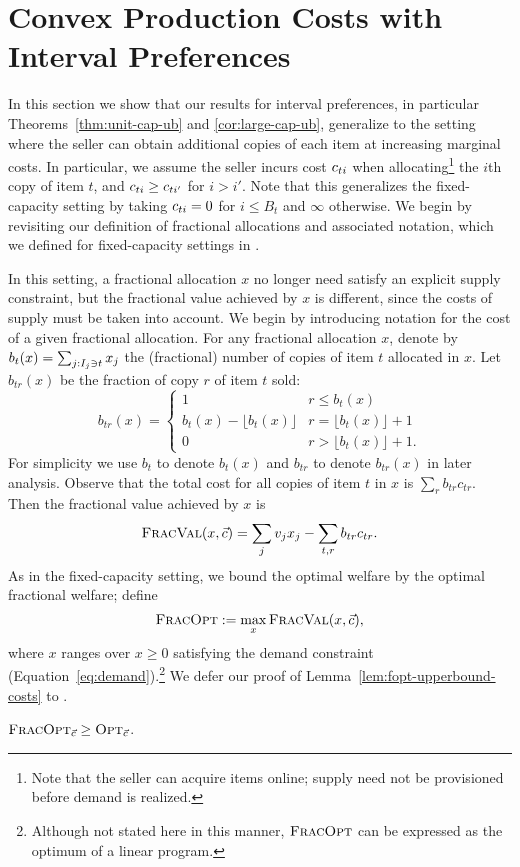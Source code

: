 \section{Convex Production Costs with Interval Preferences}
\label{sec:costs}

In this section we show that our results for interval preferences, in
particular Theorems~\ref{thm:unit-cap-ub} and \ref{cor:large-cap-ub},
generalize to the setting where the seller can obtain additional
copies of each item at increasing marginal costs. In particular, we
assume the seller incurs cost $\cti$ when allocating\footnote{Note
  that the seller can acquire items online; supply need not be
  provisioned before demand is realized.} the $i$th copy of item $t$,
and $\cti \ge \cti[ti']$ for $i > i'$.  Note that this generalizes the
fixed-capacity setting by taking $\cti = 0$ for $i \le B_t$ and
$\infty$ otherwise.  We begin by revisiting our definition of
fractional allocations and associated notation, which we defined for
fixed-capacity settings in .


In this setting, a fractional allocation $x$ no longer need satisfy an explicit
supply constraint, but the fractional value achieved by $x$ is different, since
the costs of supply must be taken into account.  We begin by introducing
notation for the cost of a given fractional allocation. For any fractional
allocation $x$, denote by $b_t(x)=\sum_{j:\intj \ni t}x_j$ the (fractional)
number of copies of item $t$ allocated in $x$. Let $b_{tr}(x)$ be the fraction
of copy $r$ of item $t$ sold:
\[
    b_{tr}(x) = \begin{cases}
        1 & r\leq b_t(x) \\
        b_t(x)-\lfloor b_t(x)\rfloor & r = \lfloor b_t(x)\rfloor+1 \\
        0 & r>\lfloor b_t(x)\rfloor+1.
    \end{cases}
\]
For simplicity we use $b_t$ to denote $b_t(x)$ and $b_{tr}$ to denote
$b_{tr}(x)$ in later analysis. Observe that the total cost for all copies of
item $t$ in $x$ is $\sum_{r}b_{tr}c_{tr}$.  Then the fractional value achieved
by $x$ is
\[
    \fval(x,\costs) = \sum_j v_jx_j - \sum_{t,r}b_{tr}c_{tr}.
\]
As in the fixed-capacity setting, we bound the optimal welfare by the optimal
fractional welfare; define
\[
    \fopt := \max_{x} \fval(x,\costs),
\]
where $x$ ranges over $x \ge 0$ satisfying the demand constraint
(Equation~\ref{eq:demand}).\footnote{Although not stated here in this
  manner, $\fopt$ can be expressed as the optimum of a linear program.}  We defer our proof of
Lemma~\ref{lem:fopt-upperbound-costs} to .
\begin{lemma}
    \label{lem:fopt-upperbound-costs}
    $\fopt_{\costs} \ge \opt_{\costs}$.
\end{lemma}

